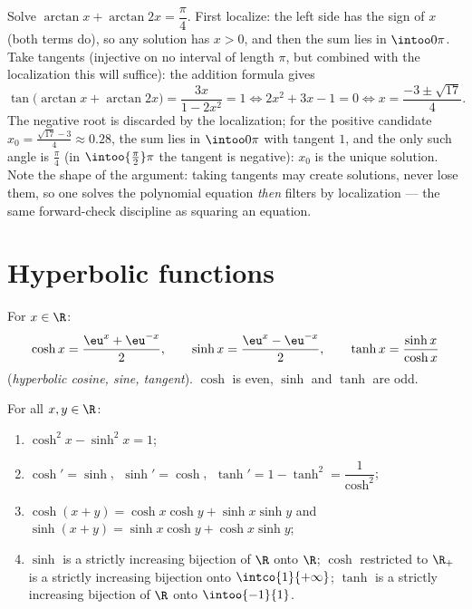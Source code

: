 \begin{example}\label{ex:b1:functions:arctaneq}
Solve $\arctan x + \arctan 2x = \dfrac\pi4$. First localize: the
left side has the sign of $x$ (both terms do), so any solution has
$x > 0$, and then the sum lies in $\intoo0\pi$. Take tangents
(injective on no interval of length $\pi$, but combined with the
localization this will suffice): the addition formula gives
\[
\tan\bigl(\arctan x + \arctan 2x\bigr)
= \frac{3x}{1 - 2x^2} = 1
\iff 2x^2 + 3x - 1 = 0
\iff x = \frac{-3 \pm \sqrt{17}}4 .
\]
The negative root is discarded by the localization; for the
positive candidate $x_0 = \frac{\sqrt{17} - 3}4 \approx 0.28$,
the sum lies in $\intoo0\pi$ with tangent $1$, and the only such
angle is $\frac\pi4$ (in $\intoo{\frac\pi2}\pi$ the tangent is
negative): $x_0$ is the unique solution. Note the shape of the
argument: taking tangents may create solutions, never lose them,
so one solves the polynomial equation \emph{then} filters by
localization --- the same forward-check discipline as squaring
an equation.
\end{example}

\section{Hyperbolic functions}

\begin{definition}[$\cosh$, $\sinh$, $\tanh$]\label{def:b1:functions:hyperbolic}
For $x \in \R$:
\[
\cosh x = \frac{\eu^x + \eu^{-x}}{2},
\qquad
\sinh x = \frac{\eu^x - \eu^{-x}}{2},
\qquad
\tanh x = \frac{\sinh x}{\cosh x}
\]
(\emph{hyperbolic cosine, sine, tangent}). $\cosh$ is even, $\sinh$ and $\tanh$ are odd.
\end{definition}

\begin{proposition}\label{prop:b1:functions:hyprules}
For all $x, y \in \R$:
\begin{enumerate}
  \item $\cosh^2 x - \sinh^2 x = 1$;
  \item $\cosh' = \sinh$, $\;\sinh' = \cosh$, $\;\tanh' = 1 - \tanh^2
        = \dfrac{1}{\cosh^2}$;
  \item $\cosh(x+y) = \cosh x\cosh y + \sinh x \sinh y$ and
        $\sinh(x+y) = \sinh x \cosh y + \cosh x \sinh y$;
  \item $\sinh$ is a strictly increasing bijection of $\R$ onto $\R$;
        $\cosh$ restricted to $\R_+$ is a strictly increasing
        bijection onto $\intco{1}{+\infty}$; $\tanh$ is a strictly
        increasing bijection of $\R$ onto $\intoo{-1}{1}$.
\end{enumerate}
\end{proposition}

